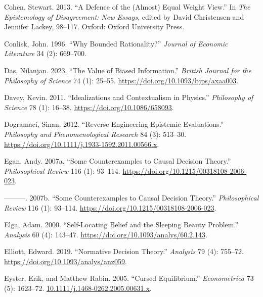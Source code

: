 \documentclass[
  12pt,
  letterpaper,
  DIV=11,
  numbers=noendperiod]{scrreprt}
\newlength{\cslhangindent}
\newlength{\cslentryspacingunit} %
\newenvironment{CSLReferences}[2] %
 {%
  \setlength{\parindent}{0pt}
  \ifodd #1
  \let\oldpar\par
  \def\par{\hangindent=\cslhangindent\oldpar}
  \fi
  \setlength{\parskip}{#2\cslentryspacingunit}
 }%
 {}
\begin{document}
\begin{CSLReferences}{1}{0}
\leavevmode{}%
Cohen, Stewart. 2013. {``A Defence of the (Almost) Equal Weight View.''}
In \emph{The Epistemology of Disagreement: New Essays}, edited by David
Christensen and Jennifer Lackey, 98--117. Oxford: Oxford University
Press.

\leavevmode{}%
Conlisk, John. 1996. {``Why Bounded Rationality?''} \emph{Journal of
Economic Literature} 34 (2): 669--700.

\leavevmode{}%
Das, Nilanjan. 2023. {``The Value of Biased Information.''}
\emph{British Journal for the Philosophy of Science} 74 (1): 25--55.
\url{https://doi.org/10.1093/bjps/axaa003}.

\leavevmode{}%
Davey, Kevin. 2011. {``Idealizations and Contextualism in Physics.''}
\emph{Philosophy of Science} 78 (1): 16--38.
\url{https://doi.org/10.1086/658093}.

\leavevmode{}%
Dogramaci, Sinan. 2012. {``Reverse Engineering Epistemic Evaluations.''}
\emph{Philosophy and Phenomenological Research} 84 (3): 513--30.
\url{https://doi.org/10.1111/j.1933-1592.2011.00566.x}.

\leavevmode{}%
Egan, Andy. 2007a. {``Some Counterexamples to Causal Decision Theory.''}
\emph{Philosophical Review} 116 (1): 93--114.
\url{https://doi.org/10.1215/00318108-2006-023}.

\leavevmode{}%
---------. 2007b. {``{Some Counterexamples to Causal Decision
Theory}.''} \emph{Philosophical Review} 116 (1): 93--114.
\url{https://doi.org/10.1215/00318108-2006-023}.

\leavevmode{}%
Elga, Adam. 2000. {``Self-Locating Belief and the Sleeping Beauty
Problem.''} \emph{Analysis} 60 (4): 143--47.
\url{https://doi.org/10.1093/analys/60.2.143}.

\leavevmode{}%
Elliott, Edward. 2019. {``Normative Decision Theory.''} \emph{Analysis}
79 (4): 755--72. \url{https://doi.org/10.1093/analys/anz059}.

\leavevmode{}%
Eyster, Erik, and Matthew Rabin. 2005. {``Cursed Equilibrium.''}
\emph{Econometrica} 73 (5): 1623--72.
\href{https://10.1111/j.1468-0262.2005.00631.x}{10.1111/j.1468-0262.2005.00631.x}.


\end{CSLReferences}
\end{document}
